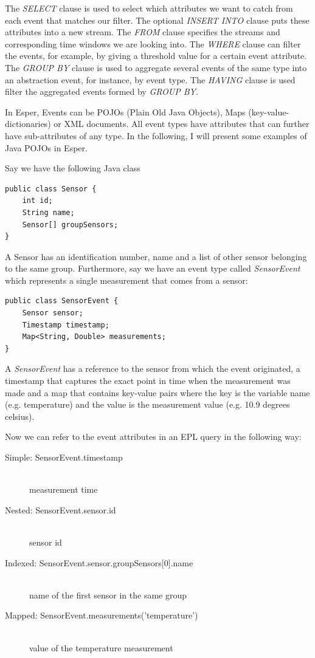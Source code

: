 The \emph{SELECT} clause is used to select which attributes we want to catch from each event that matches our filter. The optional \emph{INSERT INTO} clause puts these attributes into a new stream. The \emph{FROM} clause specifies the streams and corresponding time windows we are looking into. The \emph{WHERE} clause can filter the events, for example, by giving a threshold value for a certain event attribute. The \emph{GROUP BY} clause is used to aggregate several events of the same type into an abstraction event, for instance, by event type. The \emph{HAVING} clause is used filter the aggregated events formed by \emph{GROUP BY}. \cite{Bui08} 

In Esper, Events can be POJOs (Plain Old Java Objects), Maps (key-value-dictionaries) or XML documents. All event types have attributes that can further have sub-attributes of any type. \cite{EsperReference} In the following, I will present some examples of Java POJOs in Esper.

Say we have the following Java class
\begin{Verbatim}[xleftmargin=1.5em]
public class Sensor {
	int id;
	String name;
	Sensor[] groupSensors;  
}
\end{Verbatim}

A Sensor has an identification number, name and a list of other sensor belonging to the same group. Furthermore, say we have an event type called \emph{SensorEvent} which represents a single measurement that comes from a sensor:
\begin{Verbatim}[xleftmargin=1.5em]
public class SensorEvent {
	Sensor sensor;
	Timestamp timestamp;
	Map<String, Double> measurements;
}
\end{Verbatim}

A \emph{SensorEvent} has a reference to the sensor from which the event originated, a timestamp that captures the exact point in time when the measurement was made and a map that contains key-value pairs where the key is the variable name (e.g. temperature) and the value is the measurement value (e.g. 10.9 degrees celsius).

Now we can refer to the event attributes in an EPL query in the following way:

\begin{description}
	\item[Simple: SensorEvent.timestamp] \hfill \\
	measurement time
	\item[Nested: SensorEvent.sensor.id] \hfill \\
	sensor id
	\item[Indexed: SensorEvent.sensor.groupSensors{[0]}.name] \hfill \\
	name of the first sensor in the same group
	\item[Mapped: SensorEvent.measurements('temperature')] \hfill \\
	value of the temperature measurement
\end{description}

